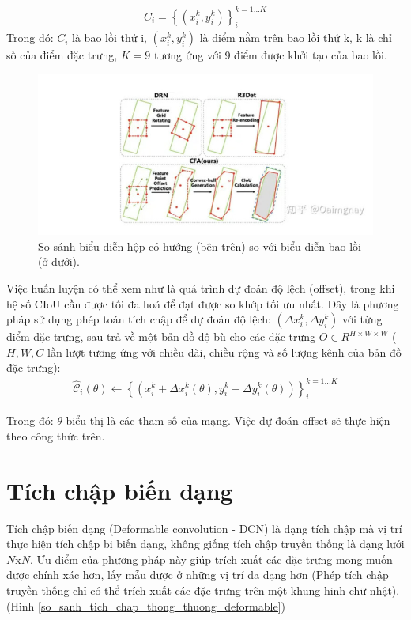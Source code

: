 \documentclass[12pt,a4paper,openany,oneside]{report}
\begin{document}
\begin{align} \label{convex_hull_definition}
		C_i=\left\{\left(x_i^k, y_i^k\right)\right\}_i^{k=1 \ldots K}
\end{align}
Trong đó: $C_i$ là bao lồi thứ i, $\left(x_i^k, y_i^k\right)$ là điểm nằm trên bao lồi thứ k, k là chỉ số của điểm đặc trưng, $K = 9$ tương ứng với 9 điểm được khởi tạo của bao lồi.

\begin{figure}[ht!]
	\begin{center}
		\includegraphics[width=445px]{./compare_convex-hull_with_rectangle.jpg}
		\caption{So sánh biểu diễn hộp có hướng (bên trên) so với biểu diễn bao lồi (ở dưới).}
	\end{center}
\end{figure} 


Việc huấn luyện có thể xem như là quá trình dự đoán độ lệch (offset), trong khi hệ số CIoU cần được tối đa hoá để đạt được so khớp tối ưu nhất. Đây là phương pháp sử dụng phép toán tích chập để dự đoán độ lệch:
$\left(\Delta x_i^k, \Delta y_i^k\right)$
với từng điểm đặc trưng, sau trả về một bản đồ độ bù cho các đặc trưng
$O \in R^{H \times W \times W}$ ($H, W, C$ lần lượt tương ứng với chiều dài, chiều rộng và số lượng kênh của bản đồ đặc trưng):
\begin{align} \label{convex_hull_learn_offset}
	\hat{\mathcal{C}}_i(\theta) \leftarrow\left\{\left(x_i^k+\Delta x_i^k(\theta), y_i^k+\Delta y_i^k(\theta)\right)\right\}_i^{k=1 \ldots K}
\end{align}

Trong đó: $\theta$ biểu thị là các tham số của mạng. Việc dự đoán offset sẽ thực hiện theo công thức trên.

\section{Tích chập biến dạng}
Tích chập biến dạng (Deformable convolution - DCN) \cite{DCN} là dạng tích chập mà vị trí thực hiện tích chập bị biến dạng, không giống tích chập truyền thống là dạng lưới $N\mathrm{x}N$. Ưu điểm của phương pháp này giúp trích xuất các đặc trưng mong muốn được chính xác hơn, lấy mẫu được ở những vị trí đa dạng hơn (Phép tích chập truyền thống chỉ có thể trích xuất các đặc trưng trên một khung hinh chữ nhật).(Hình \ref{so_sanh_tich_chap_thong_thuong_deformable})
\end{document}
